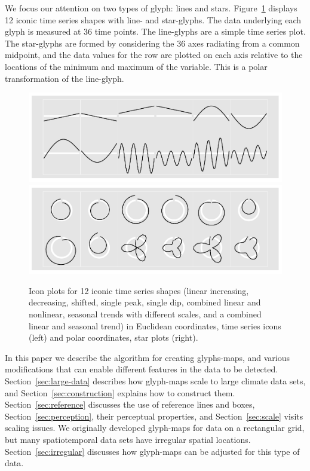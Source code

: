 \documentclass[oneside]{article}
\begin{document}
We focus our attention on two types of glyph: lines and stars. Figure~\ref{fig:templates} displays 12 iconic time series shapes with line- and star-glyphs. The data underlying each glyph is measured at 36 time points. The line-glyphs are a simple time series plot. The star-glyphs are formed by considering the 36 axes radiating from a common midpoint, and the data values for the row are plotted on each axis relative to the locations of the minimum and maximum of the variable. This is a polar transformation of the line-glyph.

\begin{figure}[htbp]
  \centering
  \includegraphics[width=0.5\linewidth]{euclid-to-polar-1}%
  \includegraphics[width=0.5\linewidth]{euclid-to-polar-2}

  \caption{Icon plots for 12 iconic time series shapes (linear increasing, decreasing, shifted, single peak, single dip, combined linear and nonlinear, seasonal trends with different scales, and a combined linear and seasonal trend) in Euclidean coordinates, time series icons (left) and polar coordinates, star plots (right).}
  \label{fig:templates}
\end{figure}



In this paper we describe the algorithm for creating glyphs-maps, and various modifications that can enable different features in the data to be detected. Section~\ref{sec:large-data} describes how glyph-maps scale to large climate data sets, and Section~\ref{sec:construction} explains how to construct them. Section~\ref{sec:reference} discusses the use of reference lines and boxes, Section~\ref{sec:perception}, their perceptual properties, and Section~\ref{sec:scale} visits scaling issues. We originally developed glyph-maps for data on a rectangular grid, but many spatiotemporal data sets have irregular spatial locations. Section~\ref{sec:irregular} discusses how glyph-maps can be adjusted for this type of data.
\end{document}

